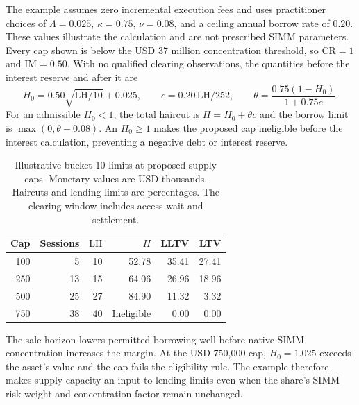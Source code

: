 The example assumes zero incremental execution fees and uses practitioner choices
of $\Lambda=0.025$, $\kappa=0.75$,
$\nu=0.08$, and a ceiling annual borrow rate of $0.20$. These values illustrate
the calculation and are not prescribed SIMM parameters. Every cap shown is below
the USD 37 million concentration threshold, so $\mathrm{CR}=1$ and
$\mathrm{IM}=0.50$. With no qualified clearing observations, the quantities before
the interest reserve and after it are
\begin{equation}\label{eq:equity-example}
H_0=0.50\sqrt{\mathrm{LH}/10}+0.025,\qquad
c=0.20\,\mathrm{LH}/252,\qquad
\theta=\frac{0.75(1-H_0)}{1+0.75c}.
\end{equation}
For an admissible $H_0<1$, the total haircut is $H=H_0+\theta c$ and the borrow
limit is $\max(0,\theta-0.08)$. An $H_0\ge1$ makes the proposed cap ineligible
before the interest calculation, preventing a negative debt or interest reserve.

\begin{table}[htbp]
\centering\small
\caption{Illustrative bucket-10 limits at proposed supply caps. Monetary values
are USD thousands. Haircuts and lending limits are percentages.
The clearing window includes access wait and settlement.}
\label{tab:equity-example}
\begin{tabular}{@{}rrrrrr@{}}
\toprule
Cap & Sessions & $\mathrm{LH}$ & $H$ & LLTV & LTV \\
\midrule
100 & 5 & 10 & 52.78 & 35.41 & 27.41 \\
250 & 13 & 15 & 64.06 & 26.96 & 18.96 \\
500 & 25 & 27 & 84.90 & 11.32 & 3.32 \\
750 & 38 & 40 & Ineligible & 0.00 & 0.00 \\
\bottomrule
\end{tabular}
\end{table}

The sale horizon lowers permitted borrowing well before native SIMM concentration
increases the margin. At the USD 750{,}000 cap, $H_0=1.025$ exceeds the asset's
value and the cap fails the eligibility rule. The example therefore makes supply
capacity an input to lending limits even when the share's SIMM risk weight and
concentration factor remain unchanged.
